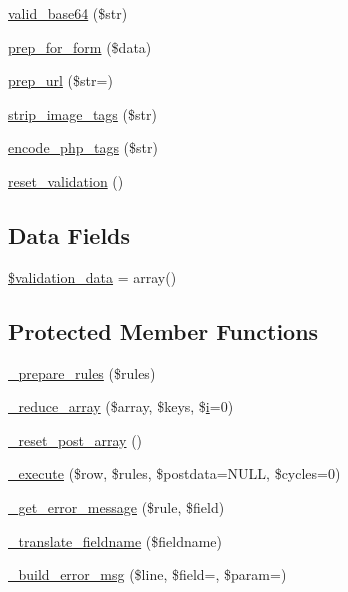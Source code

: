 \begin{DoxyCompactItemize}
\mbox{\hyperlink{class_c_i___form__validation_a9bec2f0a508e0327d4b048ecfc204522}{valid\+\_\+base64}} (\$str)
\item 
\mbox{\hyperlink{class_c_i___form__validation_a53938e0a994c9995de5c979ecb27bf1d}{prep\+\_\+for\+\_\+form}} (\$data)
\item 
\mbox{\hyperlink{class_c_i___form__validation_a1218a70d68fe797013a53b3c7cd41d2f}{prep\+\_\+url}} (\$str=\textquotesingle{}\textquotesingle{})
\item 
\mbox{\hyperlink{class_c_i___form__validation_abb836a42971c7bc641588db779c6ab1d}{strip\+\_\+image\+\_\+tags}} (\$str)
\item 
\mbox{\hyperlink{class_c_i___form__validation_ae8fff4cb083a2a66c900f8bd61216bdd}{encode\+\_\+php\+\_\+tags}} (\$str)
\item 
\mbox{\hyperlink{class_c_i___form__validation_a84b8bd64032f6be532968015cba11361}{reset\+\_\+validation}} ()
\end{DoxyCompactItemize}
\subsection*{Data Fields}
\begin{DoxyCompactItemize}
\item 
\mbox{\hyperlink{class_c_i___form__validation_af1df05337bb40c1d30c3d8c62fe8696c}{\$validation\+\_\+data}} = array()
\end{DoxyCompactItemize}
\subsection*{Protected Member Functions}
\begin{DoxyCompactItemize}
\item 
\mbox{\hyperlink{class_c_i___form__validation_ada388c3a7f360165699597f638faf127}{\+\_\+prepare\+\_\+rules}} (\$rules)
\item 
\mbox{\hyperlink{class_c_i___form__validation_a20ed7e44a35f5a5f6db5a6b220151df0}{\+\_\+reduce\+\_\+array}} (\$array, \$keys, \$\mbox{\hyperlink{interfacei}{i}}=0)
\item 
\mbox{\hyperlink{class_c_i___form__validation_a5cb72e21d23a62d15655b8caaa493698}{\+\_\+reset\+\_\+post\+\_\+array}} ()
\item 
\mbox{\hyperlink{class_c_i___form__validation_a00fc7d98650d07098dd4a13b486c3dea}{\+\_\+execute}} (\$row, \$rules, \$postdata=N\+U\+LL, \$cycles=0)
\item 
\mbox{\hyperlink{class_c_i___form__validation_a1c0eda169a1c36fe0bcc61a863690297}{\+\_\+get\+\_\+error\+\_\+message}} (\$rule, \$field)
\item 
\mbox{\hyperlink{class_c_i___form__validation_ae6b1edc93754376c05622d905845c215}{\+\_\+translate\+\_\+fieldname}} (\$fieldname)
\item 
\mbox{\hyperlink{class_c_i___form__validation_a970cb9f78d6cefc93e795d4d72e085af}{\+\_\+build\+\_\+error\+\_\+msg}} (\$line, \$field=\textquotesingle{}\textquotesingle{}, \$param=\textquotesingle{}\textquotesingle{})
\end{DoxyCompactItemize}
